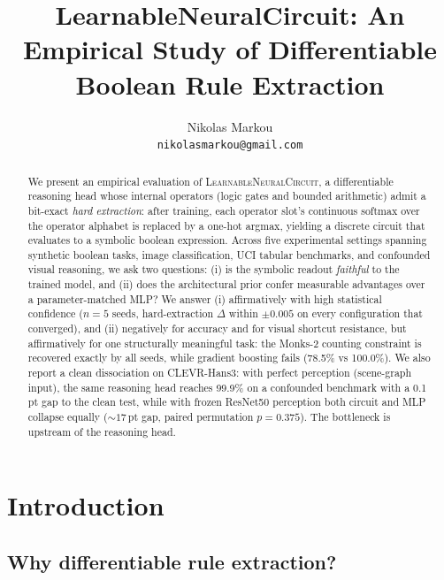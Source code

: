 \documentclass{article}
\title{LearnableNeuralCircuit: An Empirical Study of Differentiable Boolean Rule Extraction}
\author{
  Nikolas Markou \\
  \texttt{nikolasmarkou@gmail.com}
}
\date{}
\newcommand{\circuit}{\textsc{LearnableNeuralCircuit}}
\begin{document}
\maketitle

\begin{abstract}
We present an empirical evaluation of \circuit{}, a differentiable reasoning head whose internal operators (logic gates and bounded arithmetic) admit a bit-exact \emph{hard extraction}: after training, each operator slot's continuous softmax over the operator alphabet is replaced by a one-hot argmax, yielding a discrete circuit that evaluates to a symbolic boolean expression.
Across five experimental settings spanning synthetic boolean tasks, image classification, UCI tabular benchmarks, and confounded visual reasoning, we ask two questions: (i) is the symbolic readout \emph{faithful} to the trained model, and (ii) does the architectural prior confer measurable advantages over a parameter-matched MLP?
We answer (i) affirmatively with high statistical confidence ($n{=}5$ seeds, hard-extraction $\Delta$ within $\pm 0.005$ on every configuration that converged), and (ii) negatively for accuracy and for visual shortcut resistance, but affirmatively for one structurally meaningful task: the Monks-2 counting constraint is recovered exactly by all seeds, while gradient boosting fails (78.5\% vs 100.0\%).
We also report a clean dissociation on CLEVR-Hans3: with perfect perception (scene-graph input), the same reasoning head reaches 99.9\% on a confounded benchmark with a 0.1\,pt gap to the clean test, while with frozen ResNet50 perception both circuit and MLP collapse equally (${\sim}17$\,pt gap, paired permutation $p{=}0.375$).
The bottleneck is upstream of the reasoning head.
\end{abstract}

\section{Introduction}
\label{sec:intro}

\subsection{Why differentiable rule extraction?}
\end{document}
